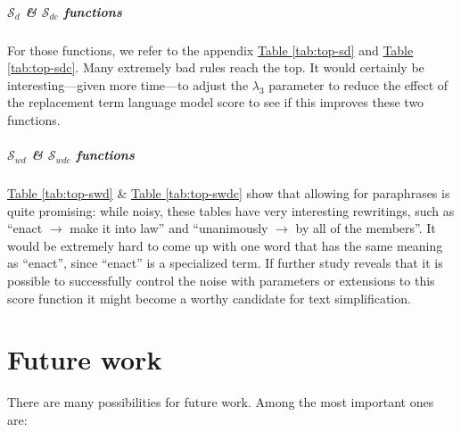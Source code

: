 \documentclass[a4paper, 11pt, onepage]{scrreprt}
\newcommand\tableref[1]{\hyperref[#1]{Table \ref*{#1}}}
\begin{document}
\paragraph*{$\mathcal{S}_d$ \& $\mathcal{S}_{dc}$ functions}
\label{par:sd-sdc}

For those functions, we refer to the appendix \tableref{tab:top-sd}
and \tableref{tab:top-sdc}. Many extremely bad rules reach the top. It
would certainly be interesting—given more time—to adjust the
$\lambda_3$ parameter to reduce the effect of the replacement term
language model score to see if this improves these two functions.

\paragraph*{$\mathcal{S}_{wd}$ \& $\mathcal{S}_{wdc}$ functions}
\label{par:swd}

\tableref{tab:top-swd} \& \tableref{tab:top-swdc} show that allowing
for paraphrases is quite promising: while noisy, these tables have
very interesting rewritings, such as “enact $\rightarrow$ make it into
law” and “unanimously $\rightarrow$ by all of the members”. It would
be extremely hard to come up with one word that has the same meaning
as “enact”, since “enact” is a specialized term. If further study
reveals that it is possible to successfully control the noise with
parameters or extensions to this score function it might become a
worthy candidate for text simplification.

\chapter{Future work}
\label{cha:future-work}

There are many possibilities for future work. Among the most important
ones are:
\end{document}
